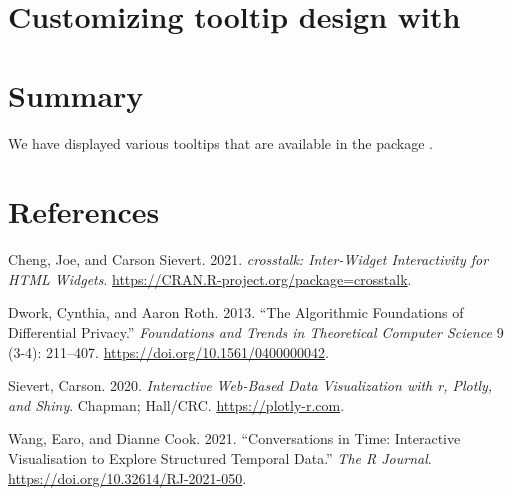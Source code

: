 \hypertarget{customizing-tooltip-design-with}{%
\section{\texorpdfstring{Customizing tooltip design with }{Customizing tooltip design with }}\label{customizing-tooltip-design-with}}

\hypertarget{summary}{%
\section{Summary}\label{summary}}

We have displayed various tooltips that are available in the package .

\hypertarget{references}{%
\section*{References}\label{references}}

\hypertarget{refs}{}
\begin{CSLReferences}{1}{0}
\leavevmode{}%
Cheng, Joe, and Carson Sievert. 2021. \emph{{crosstalk}: Inter-Widget Interactivity for HTML Widgets}. \url{https://CRAN.R-project.org/package=crosstalk}.

\leavevmode{}%
Dwork, Cynthia, and Aaron Roth. 2013. {``The Algorithmic Foundations of Differential Privacy.''} \emph{Foundations and Trends{\textregistered} in Theoretical Computer Science} 9 (3-4): 211--407. \url{https://doi.org/10.1561/0400000042}.

\leavevmode{}%
Sievert, Carson. 2020. \emph{{Interactive Web-Based Data Visualizatio}n with r, Plotly, and Shiny}. Chapman; Hall/CRC. \url{https://plotly-r.com}.

\leavevmode{}%
Wang, Earo, and Dianne Cook. 2021. {``Conversations in Time: Interactive Visualisation to Explore Structured Temporal Data.''} \emph{The R Journal}. \url{https://doi.org/10.32614/RJ-2021-050}.

\end{CSLReferences}



\address{%
Jordan A. Awan\\
Purdue University\\%
Department of Statistics\\ West Lafayette, IN 47907\\
%
\url{https://www.britannica.com/animal/quokka}\\%
%
\href{mailto:jawan@purdue.edu}{\nolinkurl{jawan@purdue.edu}}%
}


